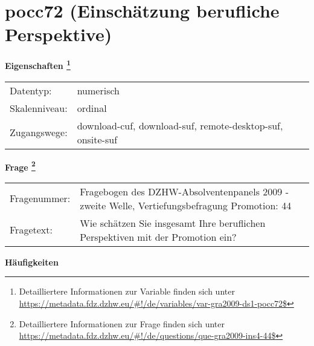 
    \setcounter{footnote}{0}

    \vspace*{-1.8cm}
	\section{pocc72 (Einschätzung berufliche Perspektive)}
	\label{section:pocc72}



    \vspace*{0.5cm}
    \noindent\textbf{Eigenschaften
	\footnote{Detailliertere Informationen zur Variable finden sich unter
		\url{https://metadata.fdz.dzhw.eu/\#!/de/variables/var-gra2009-ds1-pocc72$}}}\\
	\begin{tabularx}{\hsize}{@{}lX}
	Datentyp: & numerisch \\
	Skalenniveau: & ordinal \\
	Zugangswege: &
	  download-cuf, 
	  download-suf, 
	  remote-desktop-suf, 
	  onsite-suf
 \\
    \end{tabularx}



				\vspace*{0.5cm}
                \noindent\textbf{Frage
	                \footnote{Detailliertere Informationen zur Frage finden sich unter
		              \url{https://metadata.fdz.dzhw.eu/\#!/de/questions/que-gra2009-ins4-44$}}}\\
				\begin{tabularx}{\hsize}{@{}lX}
					Fragenummer: &
					  Fragebogen des DZHW-Absolventenpanels 2009 - zweite Welle, Vertiefungsbefragung Promotion:
					  44
 \\
					Fragetext: & Wie schätzen Sie insgesamt Ihre beruflichen Perspektiven mit der Promotion ein? \\
				\end{tabularx}





        		\vspace*{0.5cm}
                \noindent\textbf{Häufigkeiten}

